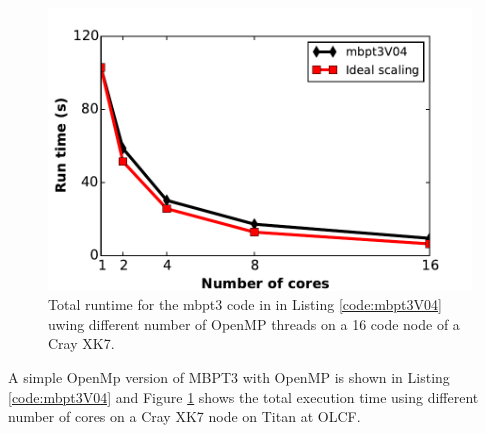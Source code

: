 \begin{figure}
\includegraphics[width=\linewidth]{Chapter8-figures/omp_scaling.pdf}
\caption{Total runtime for the mbpt3 code in in Listing \ref{code:mbpt3V04}
uwing different number of OpenMP threads on a 16 code node of a Cray XK7.}
\label{fig:mbpt3_omp}
\end{figure}
A simple OpenMp version
of MBPT3 with OpenMP is shown in Listing \ref{code:mbpt3V04} and Figure
\ref{fig:mbpt3_omp} shows the
total execution time using different number of cores on a Cray XK7 node
on Titan at OLCF.

